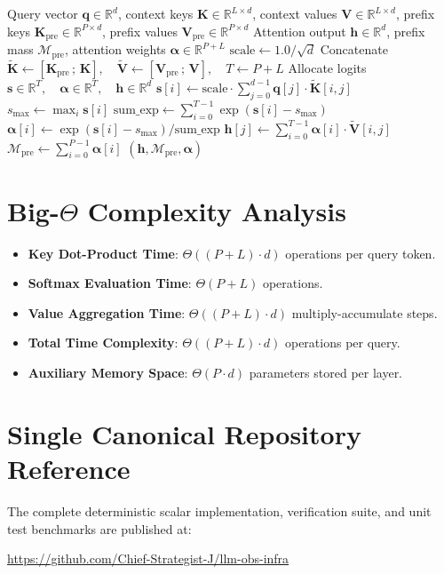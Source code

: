 \documentclass[11pt,a4paper]{article}
\theoremstyle{definition}
\begin{document}
\begin{algorithm}[H]
\caption{Prefix-Augmented Attention Forward Pass}
\begin{algorithmic}[1]
\Require Query vector $\mathbf{q} \in \mathbb{R}^d$, context keys $\mathbf{K} \in \mathbb{R}^{L \times d}$, context values $\mathbf{V} \in \mathbb{R}^{L \times d}$, prefix keys $\mathbf{K}_{\text{pre}} \in \mathbb{R}^{P \times d}$, prefix values $\mathbf{V}_{\text{pre}} \in \mathbb{R}^{P \times d}$
\Ensure Attention output $\mathbf{h} \in \mathbb{R}^d$, prefix mass $\mathcal{M}_{\text{pre}}$, attention weights $\mathbf{\alpha} \in \mathbb{R}^{P+L}$
\State $\text{scale} \gets 1.0 / \sqrt{d}$
\State Concatenate $\tilde{\mathbf{K}} \gets [\mathbf{K}_{\text{pre}} \, ; \, \mathbf{K}], \quad \tilde{\mathbf{V}} \gets [\mathbf{V}_{\text{pre}} \, ; \, \mathbf{V}], \quad T \gets P + L$
\State Allocate logits $\mathbf{s} \in \mathbb{R}^T, \quad \mathbf{\alpha} \in \mathbb{R}^T, \quad \mathbf{h} \in \mathbb{R}^d$
    \State $\mathbf{s}[i] \gets \text{scale} \cdot \sum_{j=0}^{d-1} \mathbf{q}[j] \cdot \tilde{\mathbf{K}}[i, j]$
\EndFor
\State $s_{\max} \gets \max_{i} \mathbf{s}[i]$
\State $\text{sum\_exp} \gets \sum_{i=0}^{T-1} \exp(\mathbf{s}[i] - s_{\max})$
    \State $\mathbf{\alpha}[i] \gets \exp(\mathbf{s}[i] - s_{\max}) / \text{sum\_exp}$
\EndFor
{}
    \State $\mathbf{h}[j] \gets \sum_{i=0}^{T-1} \mathbf{\alpha}[i] \cdot \tilde{\mathbf{V}}[i, j]$
\EndFor
\State $\mathcal{M}_{\text{pre}} \gets \sum_{i=0}^{P-1} \mathbf{\alpha}[i]$
\State \Return $(\mathbf{h}, \mathcal{M}_{\text{pre}}, \mathbf{\alpha})$
\end{algorithmic}
\end{algorithm}

\section{Big-$\Theta$ Complexity Analysis}

\begin{itemize}
    \item \textbf{Key Dot-Product Time}: $\Theta((P + L) \cdot d)$ operations per query token.
    \item \textbf{Softmax Evaluation Time}: $\Theta(P + L)$ operations.
    \item \textbf{Value Aggregation Time}: $\Theta((P + L) \cdot d)$ multiply-accumulate steps.
    \item \textbf{Total Time Complexity}: $\Theta((P + L) \cdot d)$ operations per query.
    \item \textbf{Auxiliary Memory Space}: $\Theta(P \cdot d)$ parameters stored per layer.
\end{itemize}

\section{Single Canonical Repository Reference}

The complete deterministic scalar implementation, verification suite, and unit test benchmarks are published at:
\begin{center}
\url{https://github.com/Chief-Strategist-J/llm-obs-infra}
\end{center}
\end{document}
